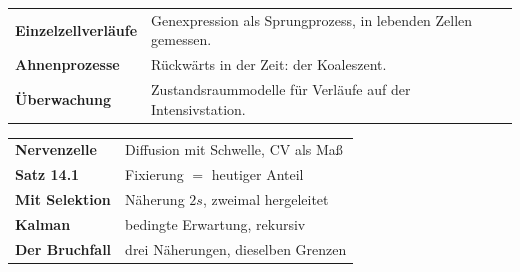 \begin{forschung}
\begin{center}
{\small
\renewcommand{\arraystretch}{1.45}
\begin{tabular}{@{}P{3.0cm}P{5.2cm}@{}}
\toprule
\textbf{Einzelzellverläufe} & Genexpression als Sprungprozess, in lebenden Zellen gemessen.\\
\textbf{Ahnenprozesse} & Rückwärts in der Zeit: der Koaleszent.\\
\textbf{Überwachung} & Zustandsraummodelle für Verläufe auf der Intensivstation.\\
\bottomrule
\end{tabular}}
\end{center}

\begin{center}
\begin{minipage}{0.88\textwidth}
\end{minipage}
\end{center}
\end{forschung}

\begin{merksatz}
\begin{center}
\renewcommand{\arraystretch}{1.5}
\begin{tabular}{@{}P{3.0cm}P{5.6cm}@{}}
\toprule
\textbf{Nervenzelle} & Diffusion mit Schwelle, $\mathrm{CV}$ als Maß\\
\textbf{Satz 14.1} & Fixierung $=$ heutiger Anteil\\
\textbf{Mit Selektion} & Näherung $2s$, zweimal hergeleitet\\
\textbf{Kalman} & bedingte Erwartung, rekursiv\\
\textbf{Der Bruchfall} & drei Näherungen, dieselben Grenzen\\
\bottomrule
\end{tabular}
\end{center}

\begin{center}
\begin{minipage}{0.88\textwidth}
\end{minipage}
\end{center}
\end{merksatz}
